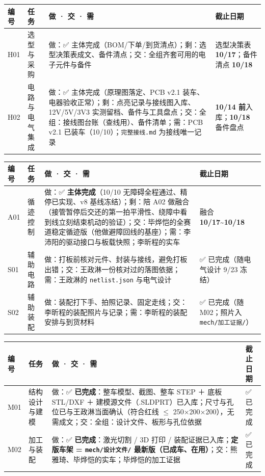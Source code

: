 \documentclass[10.5pt]{article}
\begin{document}
\vspace{5pt}{\bfseries 王政淋 —— H01 · H02}\par\vspace{2pt}
{\small
\begin{longtable}{@{}L{1.0cm}L{2.3cm}L{9.7cm}L{4.8cm}@{}}
\toprule
\textbf{编号} & \textbf{任务} & \textbf{做 · 交 · 需} & \textbf{截止日期}\tabularnewline
\midrule
\endhead
H01 & 选型与采购 & 做：✅ 主体完成（BOM/下单/到货清点）；剩：选型决策表成文、备件清点；交：全组齐套可用的电子元件与备件 & 选型决策表 \textbf{10/17}；备件清点 \textbf{10/18}\tabularnewline
H02 & 电路与电气集成 & 做：✅ 主体完成（原理图落定、PCB v2.1 装车、电器验收正常）；剩：点亮记录与接线图入库、12V/5V/3V3 实测留档、备件与工具盘点；交：全组：接线图台账（查线用）、备件清单；需：PCB v2.1 已装车（10/10）；\texttt{完整接线.md} 为接线唯一记录 & \textbf{10/14 前}入库；\textbf{10/18} 备件盘点\tabularnewline
\bottomrule
\end{longtable}

}

\vspace{5pt}{\bfseries 熊雅琦 —— A01 · S01 · S02}\par\vspace{2pt}
{\small
\begin{longtable}{@{}L{1.0cm}L{2.3cm}L{9.7cm}L{4.8cm}@{}}
\toprule
\textbf{编号} & \textbf{任务} & \textbf{做 · 交 · 需} & \textbf{截止日期}\tabularnewline
\midrule
\endhead
A01 & 循迹控制 & 做：✅ \textbf{主体完成}（10/10 无障碍全程通过、精停已实现、v8 基线冻结）；剩：陪 A02 做融合（接管暂停后交还的第一拍平滑性、绕障中看到线立刻结束机动的验证）；交：毕烨恺的全赛道稳定循迹版（他做避障回线的基座）；需：李沛阳的驱动接口与板载快照；李昕程的实车 & 融合 \textbf{10/17\textasciitilde{}10/18}\tabularnewline
S01 & 辅助电路 & 做：打板前核对元件、封装与接线，避免打板出错；交：王政淋一份核对过的落图依据；需：王政淋的 \texttt{netlist.json} 与电气设计 & ✅ 已完成（随电气设计 9/23 冻结）\tabularnewline
S02 & 辅助装配 & 做：装配打下手、拍照记录、固定走线；交：李昕程的装配照片与记录；需：李昕程的装配安排与到货材料 & ✅ 已完成（随 M02；照片入 \texttt{mech/加工证据/}）\tabularnewline
\bottomrule
\end{longtable}

}

\vspace{5pt}{\bfseries 李昕程 —— M01 · M02}\par\vspace{2pt}
{\small
\begin{longtable}{@{}L{1.0cm}L{2.3cm}L{9.7cm}L{4.8cm}@{}}
\toprule
\textbf{编号} & \textbf{任务} & \textbf{做 · 交 · 需} & \textbf{截止日期}\tabularnewline
\midrule
\endhead
M01 & 结构设计与建模 & 做：✅ \textbf{已完成}：整车模型、截图、整车 STEP ＋ 底板 STL/DXF ＋ 建模源文件（.SLDPRT）已入库；尺寸与孔位已与王政淋当面确认（符合红线 $\leq$ 250×200×200），无需成文；交：全组：设计文件、板形与孔位依据 & ✅ 已完成\tabularnewline
M02 & 加工与装配 & 做：✅ \textbf{已完成}：激光切割 / 3D 打印 / 装配证据已入库；\textbf{定版车架 = \texttt{mech/设计文件/} 最新版（已成车、在用）}；交：熊雅琦、毕烨恺的实车；毕烨恺的加工证据 & ✅ 已完成\tabularnewline
\bottomrule
\end{longtable}

}
\end{document}
